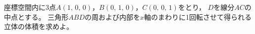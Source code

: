 \documentclass[../../main.tex]{subfiles}
\begin{document}
座標空間内に3点$A(1, \, 0, \, 0)$，$B(0, \, 1, \, 0)$，$C(0, \, 0, \, 1)$をとり，
$D$を線分$AC$の中点とする。
三角形$ABD$の周および内部を$x$軸のまわりに1回転させて得られる立体の体積を求めよ。
\end{document}
